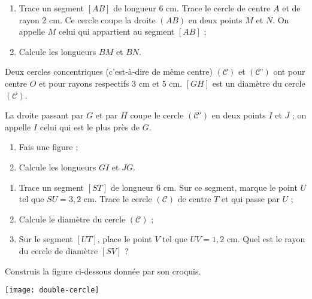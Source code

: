 \begin{exercice}[Calculs]
 \begin{enumerate}
  \item Trace un segment $[AB]$ de longueur 6 cm. Trace le cercle de centre $A$ et de rayon 2 cm. Ce cercle coupe la droite $(AB)$ en deux points $M$ et $N$. On appelle $M$ celui qui appartient au segment $[AB]$ ;
  \item Calcule les longueurs $BM$ et $BN$.
 \end{enumerate}
\end{exercice}


\begin{exercice}[Concentriques]
Deux cercles concentriques (c'est‑à‑dire de même centre) $(\mathcal{C})$ et $(\mathcal{C’})$ ont pour centre $O$ et pour rayons respectifs 3 cm et 5 cm. $[GH]$ est un diamètre du cercle $(\mathcal{C})$. 

La droite passant par $G$ et par $H$ coupe le cercle $(\mathcal{C'})$ en deux points $I$ et $J$ ; on appelle $I$ celui qui est le plus près de $G$.
\begin{enumerate}
  \item Fais une figure ;
  \item Calcule les longueurs $GI$ et $JG$.
 \end{enumerate}
\end{exercice}


\begin{exercice}[Calculs]
\begin{enumerate}
  \item Trace un segment $[ST]$ de longueur 6 cm. Sur ce segment, marque le point $U$ tel que $SU = 3,2$ cm. Trace le cercle $(\mathcal{C})$ de centre $T$ et qui passe par $U$ ;
  \item Calcule le diamètre du cercle $(\mathcal{C})$ ;
  \item Sur le segment $[UT]$, place le point $V$ tel que $UV = 1,2$ cm. Quel est le rayon du cercle de diamètre $[SV]$ ?
 \end{enumerate}
\end{exercice}


\begin{exercice}
Construis la figure ci-dessous donnée par son croquis.

\begin{center} \texttt{[image: double-cercle]} \end{center}
\end{exercice}


